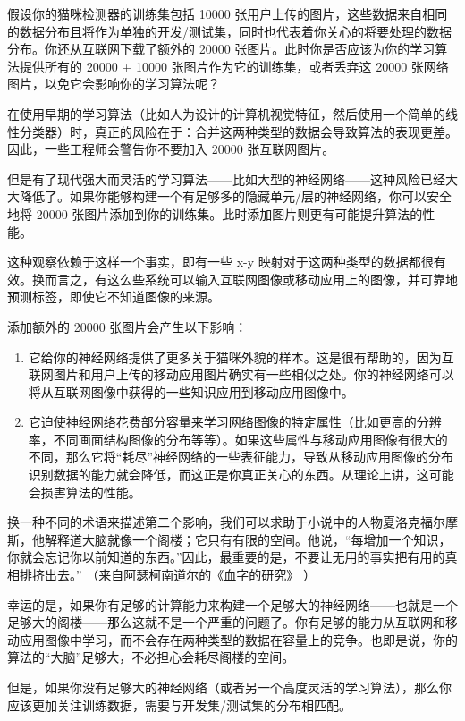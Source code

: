 假设你的猫咪检测器的训练集包括 10000
张用户上传的图片，这些数据来自相同的数据分布且将作为单独的开发/测试集，同时也代表着你关心的将要处理的数据分布。你还从互联网下载了额外的
20000 张图片。此时你是否应该为你的学习算法提供所有的 20000 + 10000
张图片作为它的训练集，或者丢弃这 20000
张网络图片，以免它会影响你的学习算法呢？

在使用早期的学习算法（比如人为设计的计算机视觉特征，然后使用一个简单的线性分类器）时，真正的风险在于：合并这两种类型的数据会导致算法的表现更差。因此，一些工程师会警告你不要加入
20000 张互联网图片。

但是有了现代强大而灵活的学习算法------比如大型的神经网络------这种风险已经大大降低了。如果你能够构建一个有足够多的隐藏单元/层的神经网络，你可以安全地将
20000 张图片添加到你的训练集。此时添加图片则更有可能提升算法的性能。

这种观察依赖于这样一个事实，即有一些 x-y
映射对于这两种类型的数据都很有效。换而言之，有这么些系统可以输入互联网图像或移动应用上的图像，并可靠地预测标签，即使它不知道图像的来源。

添加额外的 20000 张图片会产生以下影响：

\begin{enumerate}
\def\labelenumi{\arabic{enumi}.}
\tightlist
\item
  它给你的神经网络提供了更多关于猫咪外貌的样本。这是很有帮助的，因为互联网图片和用户上传的移动应用图片确实有一些相似之处。你的神经网络可以将从互联网图像中获得的一些知识应用到移动应用图像中。
\item
  它迫使神经网络花费部分容量来学习网络图像的特定属性（比如更高的分辨率，不同画面结构图像的分布等等）。如果这些属性与移动应用图像有很大的不同，那么它将``耗尽''神经网络的一些表征能力，导致从移动应用图像的分布识别数据的能力就会降低，而这正是你真正关心的东西。从理论上讲，这可能会损害算法的性能。
\end{enumerate}

换一种不同的术语来描述第二个影响，我们可以求助于小说中的人物夏洛克福尔摩斯，他解释道大脑就像一个阁楼；它只有有限的空间。他说，``每增加一个知识，你就会忘记你以前知道的东西。''因此，最重要的是，不要让无用的事实把有用的真相排挤出去。''
（来自阿瑟柯南道尔的《血字的研究》 ）

幸运的是，如果你有足够的计算能力来构建一个足够大的神经网络------也就是一个足够大的阁楼------那么这就不是一个严重的问题了。你有足够的能力从互联网和移动应用图像中学习，而不会存在两种类型的数据在容量上的竞争。也即是说，你的算法的``大脑''足够大，不必担心会耗尽阁楼的空间。

但是，如果你没有足够大的神经网络（或者另一个高度灵活的学习算法），那么你应该更加关注训练数据，需要与开发集/测试集的分布相匹配。

